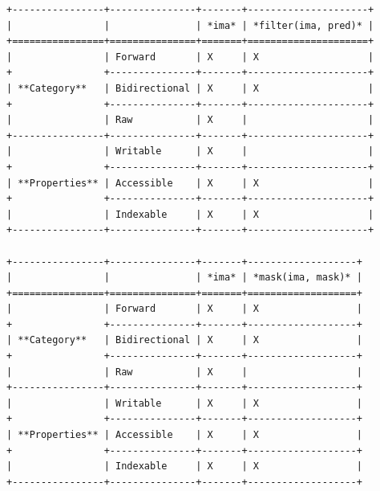 \begin{verbatim}
+----------------+---------------+-------+---------------------+
|                |               | *ima* | *filter(ima, pred)* |
+================+===============+=======+=====================+
|                | Forward       | X     | X                   |
+                +---------------+-------+---------------------+
| **Category**   | Bidirectional | X     | X                   |
+                +---------------+-------+---------------------+
|                | Raw           | X     |                     |
+----------------+---------------+-------+---------------------+
|                | Writable      | X     |                     |
+                +---------------+-------+---------------------+
| **Properties** | Accessible    | X     | X                   |
+                +---------------+-------+---------------------+
|                | Indexable     | X     | X                   |
+----------------+---------------+-------+---------------------+

+----------------+---------------+-------+-------------------+
|                |               | *ima* | *mask(ima, mask)* |
+================+===============+=======+===================+
|                | Forward       | X     | X                 |
+                +---------------+-------+-------------------+
| **Category**   | Bidirectional | X     | X                 |
+                +---------------+-------+-------------------+
|                | Raw           | X     |                   |
+----------------+---------------+-------+-------------------+
|                | Writable      | X     | X                 |
+                +---------------+-------+-------------------+
| **Properties** | Accessible    | X     | X                 |
+                +---------------+-------+-------------------+
|                | Indexable     | X     | X                 |
+----------------+---------------+-------+-------------------+


\end{verbatim}
